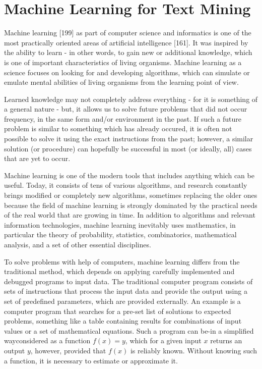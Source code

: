 \documentclass[11pt,openany,executivepaper]{book}
\begin{document}
\section{Machine Learning for Text Mining}
Machine learning [199] as part of computer science and informatics is one of the most practically oriented areas of artificial intelligence [161]. It was inspired by the ability to learn - in other words, to gain new or additional knowledge, which is one of important characteristics of living organisms. Machine learning as a science focuses on looking for and developing algorithms, which can simulate or emulate mental abilities of living organisms from the learning point of view.

Learned knowledge may not completely address everything - for it is something of a general nature - but, it allows us to solve future problems that did not occur frequency, in the same form and/or environment in the past. If such a future problem is similar to something which has already occured, it is often not possible to solve it using the exact instructions from the past; however, a similar solution (or procedure) can hopefully be successful in most (or ideally, all) cases that are yet to occur.

Machine learning is one of the modern tools that includes anything which can be useful. Today, it consists of tens of various algorithms, and research constantly brings modified or completely new algorithms, sometimes replacing the older ones because the field of machine learning is strongly dominated by the practical needs of the real world that are growing in time. In addition to algorithms and relevant information technologies, machine learning inevitably uses mathematics, in particular the theory of probability, statistics, combinatorics, mathematical analysis, and a set of other essential disciplines.

To solve problems with help of computers, machine learning differs from the traditional method, which depends on applying carefully implemented and debugged programs to input data. The traditional computer program consists of sets of instructions that process the input data and provide the output using a set of predefined parameters, which are provided externally. An example is a computer program that searches for a pre-set list of solutions to expected problems, something like a table containing results for combinations of input values or a set of mathematical equations. Such a program can be-in a simplified wayconsidered as a function $f(x)=y$, which for a given input $x$ returns an output $y$, however, provided that $f(x)$ is reliably known. Without knowing such a function, it is necessary to estimate or approximate it.
\end{document}
